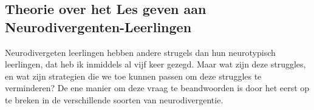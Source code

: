         \subsection{Theorie over het Les geven aan Neurodivergenten-Leerlingen}
            Neurodivergeten leerlingen hebben andere strugels dan hun neurotypisch leerlingen, dat heb ik inmiddels al vijf keer gezegd. Maar wat zijn deze struggles, en wat zijn strategien die we toe kunnen passen om deze struggles te verminderen? De ene manier om deze vraag te beandwoorden is door het eerst op te breken in de verschillende soorten van neurodivergentie\cite{neurodivergent-types}. 
